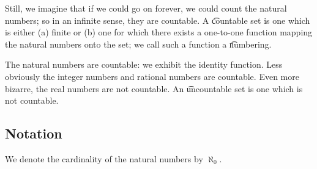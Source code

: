 Still, we imagine that if we could go on forever, we could count
the natural numbers; so in an infinite sense, they are countable.
A \t{countable} set is one which is either (a) finite or (b) one for which there exists a one-to-one function mapping the natural numbers onto the set; we call such a function a \t{numbering}.

The natural numbers are countable: we exhibit the identity function.
Less obviously the integer numbers and rational numbers are countable.
Even more bizarre, the real numbers are not countable.
An \t{uncountable} set is one which is not countable.

\subsection*{Notation}

We denote the cardinality of the natural numbers by $\aleph_0$.

